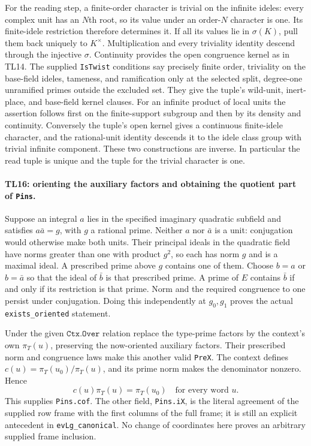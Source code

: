 For the reading step, a finite-order character is trivial on
the infinite ideles: every complex unit has an $N$th root, so
its value under an order-$N$ character is one. Its finite-idele
restriction therefore determines it. If all its values lie in
$\sigma(K)$, pull them back uniquely to $K^\times$. Multiplication
and every triviality identity descend through the injective
$\sigma$. Continuity provides the open congruence kernel as in
TL14. The supplied \texttt{IsTwist} conditions say precisely
finite order, triviality on the base-field ideles, tameness, and
ramification only at the selected split, degree-one unramified
primes outside the excluded set. They give the tuple's wild-unit,
inert-place, and base-field kernel clauses. For an infinite
product of local units the assertion follows first on the
finite-support subgroup and then by its density and continuity.
Conversely the tuple's open kernel gives a continuous finite-idele
character, and the rational-unit identity descends it to the
idele class group with trivial infinite component. These two
constructions are inverse. In particular the read tuple is
unique and the tuple for the trivial character is one.

\paragraph{TL16: orienting the auxiliary factors and obtaining the
quotient part of \texttt{Pins}.}
Suppose an integral $a$ lies in the specified imaginary quadratic
subfield and satisfies $a\bar a=g$, with $g$ a rational prime.
Neither $a$ nor $\bar a$ is a unit: conjugation would otherwise
make both units. Their principal ideals in the quadratic field
have norms greater than one with product $g^2$, so each has norm
$g$ and is a maximal ideal. A prescribed prime above $g$ contains
one of them. Choose $b=a$ or $b=\bar a$ so that the ideal of
$\bar b$ is that prescribed prime. A prime of $E$ contains
$\bar b$ if and only if its restriction is that prime. Norm and
the required congruence to one persist under conjugation. Doing
this independently at $g_0,g_1$ proves the actual
\texttt{exists\_oriented} statement.

Under the given $\texttt{Ctx.Over}$ relation replace the type-prime
factors by the context's own $\pi_T(u)$, preserving the now-oriented
auxiliary factors. Their prescribed norm and congruence laws make
this another valid \texttt{PreX}. The context defines
$c(u)=\pi_T(u_0)/\pi_T(u)$, and its prime norm makes the denominator
nonzero. Hence
\[
 c(u)\pi_T(u)=\pi_T(u_0)\quad\text{for every word }u. \tag{TL.20}
\]
This supplies \texttt{Pins.cof}. The other field,
\texttt{Pins.iX}, is the literal agreement of the supplied row
frame with the first columns of the full frame; it is still an
explicit antecedent in \texttt{evLg\_canonical}. No change of
coordinates here proves an arbitrary supplied frame inclusion.

